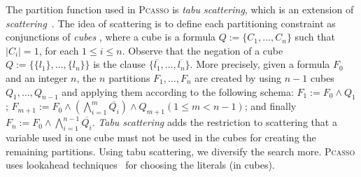 \documentclass[conference]{IEEEtran}
\newcommand{\ls}{\{}
\newcommand{\rs}{\}}
\renewcommand{\langle}{\{}
\renewcommand{\rangle}{\}}
\newcommand{\1}{x_1}
\newcommand{\2}{x_2}
\newcommand{\3}{x_3}
\newcommand{\4}{x_4}
\newcommand{\5}{x_5}
\newcommand{\6}{x_6}
\newcommand{\7}{x_7}
\newcommand{\8}{x_8}
\newcommand{\9}{x_9}
\newcommand{\pcasso}{\textsc{Pcasso}\xspace}
\def\ngt#1{\overline{#1}}
\begin{document}
The partition function used in \pcasso is \emph{tabu scattering}, which is an extension of \emph{scattering}~\cite{HJN06}. 
The idea of scattering is to define each partitioning constraint as conjunctions of \emph{cubes} \cite{HKWB12}, where a cube is a formula ${Q:=\langle C_1, \ldots, C_n\rangle}$ such that $|C_i| = 1$, for each $1 \le i \le n$. 
Observe that the negation of a cube ${Q:=\langle \ls l_1 \rs, \ldots, \ls l_n \rs \rangle}$ is the clause $\ls \ngt{l_1}, \ldots, \ngt{l_n} \rs$. 
More precisely, given a formula $F_0$ and an integer $n$, the $n$ partitions $F_1, \ldots, F_n$ are created by using $n-1$ cubes $Q_1, \ldots, Q_{n-1}$ and applying them according to the following schema:  
${F_1 := F_0 \land Q_1}$; ${F_{m+1} := F_0 \land ( \bigwedge \limits_{i=1}^{m}{\ngt{Q_{i}}} ) \land Q_{m+1} (1 \le m < n-1)}$; 
and finally $F_n := F_{0} \land \bigwedge \limits_{i=1}^{n-1}{\ngt{Q_{i}}}$.
\emph{Tabu scattering} adds the restriction to scattering that a variable used in one cube must not be used in the cubes for creating the remaining partitions.
Using tabu scattering, we diversify the search more.
%
%
\pcasso uses lookahead techniques~\cite{HvM09HBSAT} for choosing the literals (in cubes). 
\end{document}
